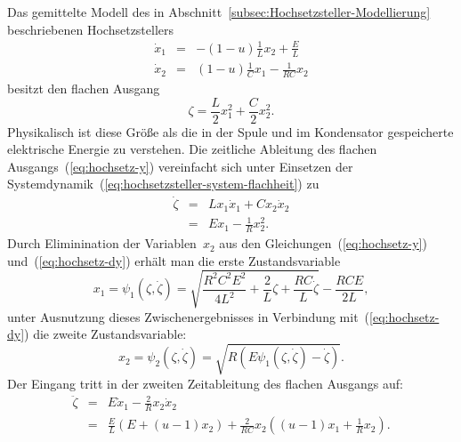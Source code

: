 \begin{example}
\label{exa:Hochsetzsteller-flach}Das gemittelte Modell des in Abschnitt~\ref{subsec:Hochsetzsteller-Modellierung}
beschriebenen Hochsetzstellers
\begin{equation}
\begin{array}{lcl}
\dot{x}_{1} & = & -(1-u)\frac{1}{L}x_{2}+\frac{E}{L}\\
\dot{x}_{2} & = & (1-u)\frac{1}{C}x_{1}-\frac{1}{RC}x_{2}
\end{array}\label{eq:hochsetzsteller-system-flachheit}
\end{equation}
besitzt den flachen Ausgang
\begin{equation}
\zeta=\frac{L}{2}x_{1}^{2}+\frac{C}{2}x_{2}^{2}.\label{eq:hochsetz-y}
\end{equation}
Physikalisch ist diese Größe als die in der Spule und im Kondensator
gespeicherte elektrische Energie zu verstehen. Die zeitliche Ableitung
des flachen Ausgangs~(\ref{eq:hochsetz-y}) vereinfacht sich unter
Einsetzen der Systemdynamik~(\ref{eq:hochsetzsteller-system-flachheit})
zu
\begin{equation}
\begin{array}{rcl}
\dot{\zeta} & = & Lx_{1}\dot{x}_{1}+Cx_{2}\dot{x}_{2}\\
 & = & Ex_{1}-\frac{1}{R}x_{2}^{2}.
\end{array}\label{eq:hochsetz-dy}
\end{equation}
Durch Eliminination der Variablen~$x_{2}$ aus den Gleichungen~(\ref{eq:hochsetz-y})
und~(\ref{eq:hochsetz-dy}) erhält man die erste Zustandsvariable
\begin{equation}
x_{1}=\psi_{1}(\zeta,\dot{\zeta})=\sqrt{\frac{R^{2}C^{2}E^{2}}{4L^{2}}+\frac{2}{L}\zeta+\frac{RC}{L}\dot{\zeta}}-\frac{RCE}{2L},\label{eq:hochsetz-flach-x1}
\end{equation}
unter Ausnutzung dieses Zwischenergebnisses in Verbindung mit~(\ref{eq:hochsetz-dy})
die zweite Zustandsvariable:
\begin{equation}
x_{2}=\psi_{2}(\zeta,\dot{\zeta})=\sqrt{R\left(E\psi_{1}(\zeta,\dot{\zeta})-\dot{\zeta}\right)}.\label{eq:hochsetz-flach-x2}
\end{equation}
Der Eingang tritt in der zweiten Zeitableitung des flachen Ausgangs
auf:
\begin{equation}
\begin{array}{rcl}
\ddot{\zeta} & = & E\dot{x}_{1}-\frac{2}{R}x_{2}\dot{x}_{2}\\
 & = & \frac{E}{L}\left(E+(u-1)x_{2}\right)+\frac{2}{RC}x_{2}\left((u-1)x_{1}+\frac{1}{R}x_{2}\right).

\end{array}
\end{equation}
\end{example}
